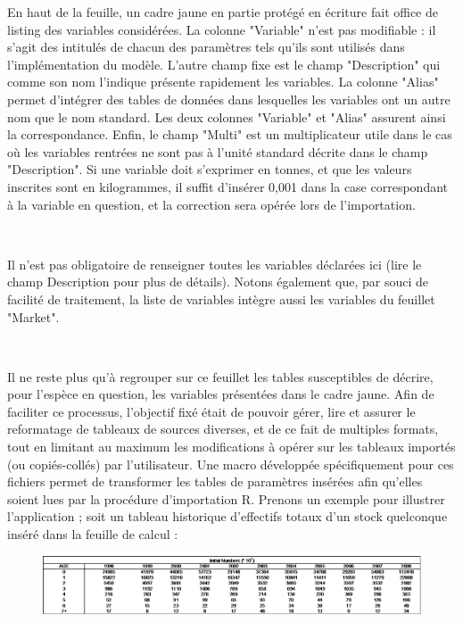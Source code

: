 \documentclass[12pt, colorinlistoftodos, notitlepage]{report}
\newenvironment{not used}[1]{%
    \longtable{%
        |>{\centering$\displaystyle}A{#1}{1}<{$}%
        |}\hline\ignorespaces}{%
    \endlongtable\ignorespacesafterend}
\newcommand\Warning{%
 \makebox[1.4em][c]{%
 \makebox[0pt][c]{\raisebox{.1em}{\small!}}%
 \makebox[0pt][c]{\color{red}\Large$\bigtriangleup$}}}%
\begin{document}
En haut de la feuille, un cadre jaune en partie protégé en écriture fait office de listing des variables considérées. La colonne "Variable" n'est pas modifiable : il s'agit des intitulés de chacun des paramètres tels qu'ils sont utilisés dans l'implémentation du modèle. L'autre champ fixe est le champ "Description" qui comme son nom l'indique présente rapidement les variables. La colonne "Alias" permet d'intégrer des tables de données dans lesquelles les variables ont un autre nom que le nom standard. Les deux colonnes "Variable" et "Alias" assurent ainsi la correspondance. Enfin, le champ "Multi" est un multiplicateur utile dans le cas où les variables rentrées ne sont pas à l'unité standard décrite dans le champ "Description". Si une variable doit s'exprimer en tonnes, et que les valeurs inscrites sont en kilogrammes, il suffit d'insérer 0,001 dans la case correspondant à la variable en question, et la correction sera opérée lors de l'importation.

\par~\par

\Warning Il n'est pas obligatoire de renseigner toutes les variables déclarées ici (lire le champ Description pour plus de détails). Notons également que, par souci de facilité de traitement, la liste de variables intègre aussi les variables du feuillet "Market".

\par~\par

Il ne reste plus qu'à regrouper sur ce feuillet les tables susceptibles de décrire, pour l'espèce en question, les variables présentées dans le cadre jaune. Afin de faciliter ce processus, l'objectif fixé était de pouvoir gérer, lire et assurer le reformatage de tableaux de sources diverses, et de ce fait de multiples formats, tout en limitant au maximum les modifications à opérer sur les tableaux importés (ou copiés-collés) par l'utilisateur. Une macro développée spécifiquement pour ces fichiers permet de transformer les tables de paramètres insérées afin qu'elles soient lues par la procédure d'importation R. Prenons un exemple pour illustrer l'application ; soit un tableau historique d'effectifs totaux d'un stock quelconque inséré dans la feuille de calcul :

\begin{figure}[h!]
\begin{center}
\includegraphics[width = \textwidth]{figures/param/stock1.png}
\end{center}
\label{fig:ex}
\end{figure}
\end{document}

